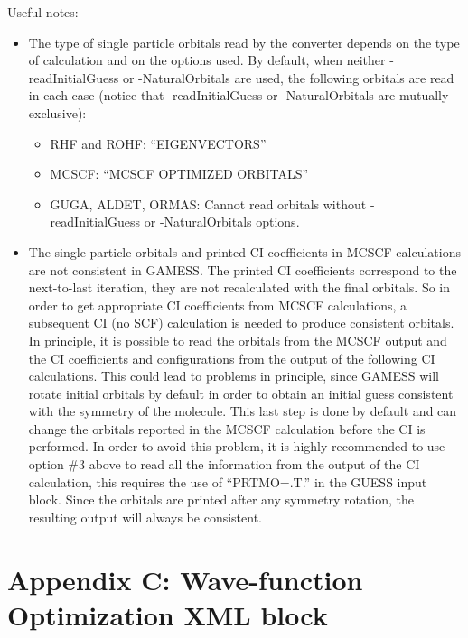 Useful notes:
\begin{itemize}
  \item{The type of single particle orbitals read by the converter depends on the type of
calculation and on the options used. By default, when neither -readInitialGuess or
-NaturalOrbitals are used, the following orbitals are read in each case (notice that
-readInitialGuess or -NaturalOrbitals are mutually exclusive):}
  \begin{itemize}
    \item{RHF and ROHF: “EIGENVECTORS”}
    \item{MCSCF: “MCSCF OPTIMIZED ORBITALS”}
    \item{GUGA, ALDET, ORMAS: Cannot read orbitals without -readInitialGuess or -NaturalOrbitals options.}
  \end{itemize}
  \item{The single particle orbitals and printed CI coefficients in MCSCF calculations are
not consistent in GAMESS. The printed CI coefficients correspond to the next-to-last
iteration, they are not recalculated with the final orbitals. So in order to get appropriate 
CI coefficients from MCSCF calculations, a subsequent CI (no SCF) calculation
is needed to produce consistent orbitals. In principle, it is possible to read the orbitals 
from the MCSCF output and the CI coefficients and configurations from the
output of the following CI calculations. This could lead to problems in principle, since
GAMESS will rotate initial orbitals by default in order to obtain an initial guess consistent 
with the symmetry of the molecule. This last step is done by default and can
change the orbitals reported in the MCSCF calculation before the CI is performed.
In order to avoid this problem, it is highly recommended to use option \#3 above to
read all the information from the output of the CI calculation, this requires the use
of “PRTMO=.T.” in the GUESS input block. Since the orbitals are printed after any
symmetry rotation, the resulting output will always be consistent.}
\end{itemize}


\newpage
\section{Appendix C: Wave-function Optimization XML block}

